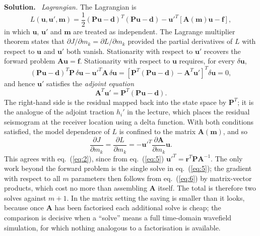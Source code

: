 \documentclass[a4paper,12pt]{paper}
\newenvironment{solution}{\par\noindent\textbf{Solution.}\ }{\par\medskip}
\begin{document}
\begin{solution}
\emph{Lagrangian.} The Lagrangian is
\begin{equation}
L(\mathbf{u},\mathbf{u}',\mathbf{m})=\frac{1}{2}(\mathbf{P}\mathbf{u}-\mathbf{d})^{T}(\mathbf{P}\mathbf{u}-\mathbf{d})
-\mathbf{u}'^{T}[\mathbf{A}(\mathbf{m})\mathbf{u}-\mathbf{f}],
\label{eq:3}
\end{equation}
in which $\mathbf{u}$, $\mathbf{u}'$ and $\mathbf{m}$ are treated as independent. The Lagrange multiplier theorem states that
$\partial J/\partial m_{k}=\partial L/\partial m_{k}$ provided the partial derivatives of $L$ with respect to $\mathbf{u}$
and $\mathbf{u}'$ both vanish. Stationarity with respect to $\mathbf{u}'$ recovers the forward problem
$\mathbf{A}\mathbf{u}=\mathbf{f}$. Stationarity with respect to $\mathbf{u}$ requires, for every $\delta\mathbf{u}$,
\begin{equation}
(\mathbf{P}\mathbf{u}-\mathbf{d})^{T}\mathbf{P}\,\delta\mathbf{u}-\mathbf{u}'^{T}\mathbf{A}\,\delta\mathbf{u}=
\left[\mathbf{P}^{T}(\mathbf{P}\mathbf{u}-\mathbf{d})-\mathbf{A}^{T}\mathbf{u}'\right]^{T}\delta\mathbf{u}=0,
\label{eq:4}
\end{equation}
and hence $\mathbf{u}'$ satisfies the \emph{adjoint equation}
\begin{equation}
\mathbf{A}^{T}\mathbf{u}'=\mathbf{P}^{T}(\mathbf{P}\mathbf{u}-\mathbf{d}).
\label{eq:5}
\end{equation}
The right-hand side is the residual mapped back into the state space by $\mathbf{P}^{T}$; it is the analogue of the
adjoint traction $h_{i}'$ in the lecture, which places the residual seismogram at the receiver location using a delta function.
With both conditions satisfied, the model dependence of $L$ is confined to the matrix $\mathbf{A}(\mathbf{m})$, and so
\begin{equation}
\frac{\partial J}{\partial m_{k}}=\frac{\partial L}{\partial m_{k}}=-\mathbf{u}'^{T}\frac{\partial\mathbf{A}}{\partial m_{k}}\mathbf{u}.
\label{eq:6}
\end{equation}
This agrees with eq.~(\ref{eq:2}), since from eq.~(\ref{eq:5}) $\mathbf{u}'^{T}=\mathbf{r}^{T}\mathbf{P}\mathbf{A}^{-1}$.
The only work beyond the forward problem is the single solve in eq.~(\ref{eq:5}); the gradient with respect to all
$m$ parameters then follows from eq.~(\ref{eq:6}) by matrix-vector products, which cost no more than assembling
$\mathbf{A}$ itself. The total is therefore two solves against $m+1$. In the matrix setting the saving is smaller than it
looks, because once $\mathbf{A}$ has been factorised each additional solve is cheap; the comparison is decisive when a
``solve'' means a full time-domain wavefield simulation, for which nothing analogous to a factorisation is available.


\end{solution}
\end{document}
